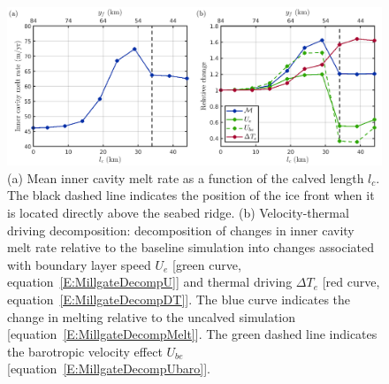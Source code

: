\documentclass[draft]{agujournal2019}
\begin{document}
\begin{figure}
    \centering
    \includegraphics[width = \textwidth]{plots/figure4.png}
    \caption{(a) Mean inner cavity melt rate as a function of the calved length $l_c$. The black dashed line indicates the position of the ice front when it is located directly above the seabed ridge. (b) Velocity-thermal driving decomposition: decomposition of changes in inner cavity melt rate relative to the baseline simulation into changes associated with boundary layer speed $U_e$ [green curve, equation~\eqref{E:MillgateDecompU}] and thermal driving $\Delta T_e$ [red curve, equation~\eqref{E:MillgateDecompDT}]. The blue curve indicates the change in melting relative to the uncalved simulation [equation~\eqref{E:MillgateDecompMelt}]. The green dashed line indicates the barotropic velocity effect $U_{be}$ [equation~\eqref{E:MillgateDecompUbaro}].  }
    \label{fig:figure4}
\end{figure}
\end{document}
